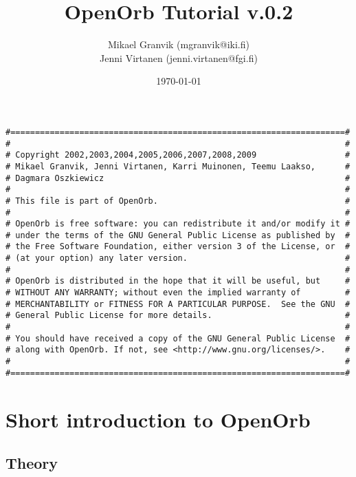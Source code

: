 \documentclass[12pt,english,twoside,a4paper]{report}
\title{OpenOrb Tutorial v.0.2}
\author{Mikael Granvik (mgranvik@iki.fi) \\ Jenni Virtanen (jenni.virtanen@fgi.fi)}
\date{\today}
\begin{document}
\maketitle
{}

\setcounter{page}{1}

\begin{verbatim}
#====================================================================#
#                                                                    #
# Copyright 2002,2003,2004,2005,2006,2007,2008,2009                  #
# Mikael Granvik, Jenni Virtanen, Karri Muinonen, Teemu Laakso,      #
# Dagmara Oszkiewicz                                                 #
#                                                                    #
# This file is part of OpenOrb.                                      #
#                                                                    #
# OpenOrb is free software: you can redistribute it and/or modify it #
# under the terms of the GNU General Public License as published by  #
# the Free Software Foundation, either version 3 of the License, or  #
# (at your option) any later version.                                #
#                                                                    #
# OpenOrb is distributed in the hope that it will be useful, but     #
# WITHOUT ANY WARRANTY; without even the implied warranty of         #
# MERCHANTABILITY or FITNESS FOR A PARTICULAR PURPOSE.  See the GNU  #
# General Public License for more details.                           #
#                                                                    #
# You should have received a copy of the GNU General Public License  #
# along with OpenOrb. If not, see <http://www.gnu.org/licenses/>.    #
#                                                                    #
#====================================================================#
\end{verbatim}

\pagebreak

\tableofcontents

\pagebreak
{}
\setcounter{page}{1}

\chapter{Short introduction to OpenOrb}

\section{Theory}
\end{document}
